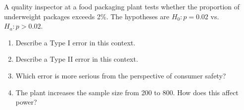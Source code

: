 \documentclass[10pt]{article}
\begin{document}
\namedateperiod

\vspace{0.15in}

A quality inspector at a food packaging plant tests whether the proportion of
underweight packages exceeds 2\%. The hypotheses are $H_0: p = 0.02$ vs.\ $H_a: p > 0.02$.

\begin{enumerate}
  \item Describe a Type I error in this context.

  \item Describe a Type II error in this context.

  \item Which error is more serious from the perspective of consumer safety?

  \item The plant increases the sample size from 200 to 800. How does this affect power?
\end{enumerate}
\end{document}
